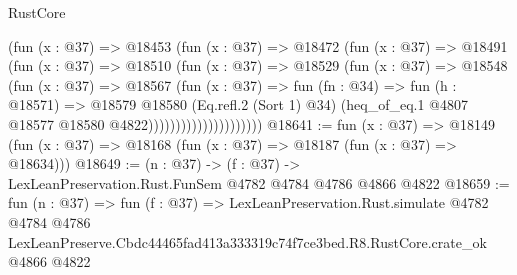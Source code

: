 \begin{lexlean}{RustCore}
\begin{coremodule}
                            (fun (x : @37) =>
                            @18453
                              (fun (x : @37) =>
                              @18472
                                (fun (x : @37) =>
                                @18491
                                  (fun (x : @37) =>
                                  @18510
                                    (fun (x : @37) =>
                                    @18529
                                      (fun (x : @37) =>
                                      @18548
                                        (fun (x : @37) =>
                                        @18567
                                          (fun (x : @37) =>
                                          fun (fn : @34) =>
                                          fun (h : @18571) =>
                                          @18579
                                            @18580
                                            (Eq.refl.{2} (Sort 1) @34)
                                            (heq_of_eq.{1}
                                              @4807
                                              @18577
                                              @18580
                                              @4822)))))))))))))))))))))
@18641 := fun (x : @37) =>
  @18149 (fun (x : @37) => @18168 (fun (x : @37) => @18187 (fun (x : @37) => @18634)))
@18649 := (n : @37) -> (f : @37) -> LexLeanPreservation.Rust.FunSem @4782 @4784 @4786 @4866 @4822
@18659 := fun (n : @37) =>
  fun (f : @37) =>
  LexLeanPreservation.Rust.simulate
    @4782
    @4784
    @4786
    LexLeanPreserve.Cbdc44465fad413a333319c74f7ce3bed.R8.RustCore.crate_ok
    @4866
    @4822
\end{coremodule}
\end{lexlean}
